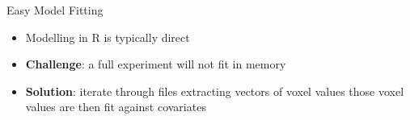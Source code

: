 \begin{frame}[fragile]{Easy Model Fitting}

\begin{itemize}[<+->]
\tightlist
\item
  Modelling in R is typically direct
\end{itemize}

\begin{Shaded}
\begin{Highlighting}[]
\StringTok{ }\StringTok{ }\StringTok{ }
     
     
\end{Highlighting}
\end{Shaded}

\begin{itemize}[<+->]
\tightlist
\item
  \textbf{Challenge}: a full experiment will not fit in memory
\item
  \textbf{Solution}: iterate through files extracting vectors of voxel
  values those voxel values are then fit against covariates
\end{itemize}

\end{frame}


